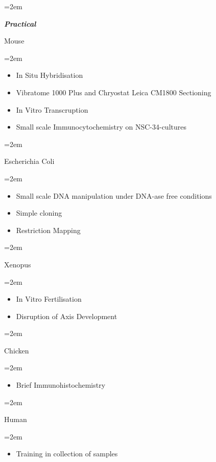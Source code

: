 \documentclass[paper=a4,fontsize=11pt]{scrartcl} %
\newlength{\spacebox}
\newcommand{\sepspace}{\vspace*{1em}}		%
\newcommand{\PersonalEntry}[2]{
		\noindent\hangindent=2em\hangafter=0 %
		\parbox{\spacebox}{        %
		\textit{#1}}		       %
		\hspace{1.5em} #2 \par}    %
\newcommand{\SkillsEntry}[2]{      %
		\noindent\hangindent=2em\hangafter=0 %
		\parbox{\spacebox}{        %
		\textit{#1}}			   %
		\hspace{1.5em} \parbox{6\spacebox}{#2} \par}    %
\begin{document}
  \SkillsEntry{\textbf{Practical}}{Mouse}
  \SkillsEntry{}{\begin{itemize}[noitemsep,topsep=0pt]
      \item In Situ Hybridisation
      \item Vibratome 1000 Plus and Chryostat Leica CM1800 Sectioning
      \item In Vitro Transcruption
      \item Small scale Immunocytochemistry on NSC-34-cultures
    \end{itemize}}
    \vspace{3pt}
  \SkillsEntry{}{Escherichia Coli}
  \SkillsEntry{}{\begin{itemize}[noitemsep,topsep=0pt]
      \item Small scale DNA manipulation under DNA-ase free conditions
      \item Simple cloning %
      \item Restriction Mapping
    \end{itemize}}
    \vspace{3pt}
  \SkillsEntry{}{Xenopus}
  \SkillsEntry{}{\begin{itemize}[noitemsep,topsep=0pt]
      \item In Vitro Fertilisation
      \item Disruption of Axis Development
    \end{itemize}}
    \vspace{3pt}
  \SkillsEntry{}{Chicken}
  \SkillsEntry{}{\begin{itemize}[noitemsep,topsep=0pt]
        \item Brief Immunohistochemistry
    \end{itemize}}
    \vspace{3pt}
  \SkillsEntry{}{Human}
  \SkillsEntry{}{\begin{itemize}[noitemsep,topsep=0pt]
      \item Training in collection of samples
    \end{itemize}}
  \sepspace
\end{document}
